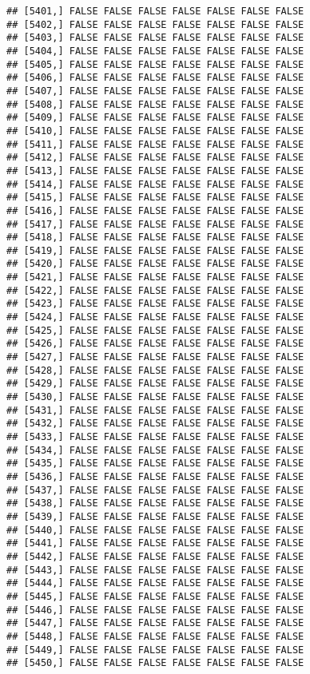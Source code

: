 \documentclass[
]{article}
\begin{document}
\begin{verbatim}
## [5401,] FALSE FALSE FALSE FALSE FALSE FALSE FALSE
## [5402,] FALSE FALSE FALSE FALSE FALSE FALSE FALSE
## [5403,] FALSE FALSE FALSE FALSE FALSE FALSE FALSE
## [5404,] FALSE FALSE FALSE FALSE FALSE FALSE FALSE
## [5405,] FALSE FALSE FALSE FALSE FALSE FALSE FALSE
## [5406,] FALSE FALSE FALSE FALSE FALSE FALSE FALSE
## [5407,] FALSE FALSE FALSE FALSE FALSE FALSE FALSE
## [5408,] FALSE FALSE FALSE FALSE FALSE FALSE FALSE
## [5409,] FALSE FALSE FALSE FALSE FALSE FALSE FALSE
## [5410,] FALSE FALSE FALSE FALSE FALSE FALSE FALSE
## [5411,] FALSE FALSE FALSE FALSE FALSE FALSE FALSE
## [5412,] FALSE FALSE FALSE FALSE FALSE FALSE FALSE
## [5413,] FALSE FALSE FALSE FALSE FALSE FALSE FALSE
## [5414,] FALSE FALSE FALSE FALSE FALSE FALSE FALSE
## [5415,] FALSE FALSE FALSE FALSE FALSE FALSE FALSE
## [5416,] FALSE FALSE FALSE FALSE FALSE FALSE FALSE
## [5417,] FALSE FALSE FALSE FALSE FALSE FALSE FALSE
## [5418,] FALSE FALSE FALSE FALSE FALSE FALSE FALSE
## [5419,] FALSE FALSE FALSE FALSE FALSE FALSE FALSE
## [5420,] FALSE FALSE FALSE FALSE FALSE FALSE FALSE
## [5421,] FALSE FALSE FALSE FALSE FALSE FALSE FALSE
## [5422,] FALSE FALSE FALSE FALSE FALSE FALSE FALSE
## [5423,] FALSE FALSE FALSE FALSE FALSE FALSE FALSE
## [5424,] FALSE FALSE FALSE FALSE FALSE FALSE FALSE
## [5425,] FALSE FALSE FALSE FALSE FALSE FALSE FALSE
## [5426,] FALSE FALSE FALSE FALSE FALSE FALSE FALSE
## [5427,] FALSE FALSE FALSE FALSE FALSE FALSE FALSE
## [5428,] FALSE FALSE FALSE FALSE FALSE FALSE FALSE
## [5429,] FALSE FALSE FALSE FALSE FALSE FALSE FALSE
## [5430,] FALSE FALSE FALSE FALSE FALSE FALSE FALSE
## [5431,] FALSE FALSE FALSE FALSE FALSE FALSE FALSE
## [5432,] FALSE FALSE FALSE FALSE FALSE FALSE FALSE
## [5433,] FALSE FALSE FALSE FALSE FALSE FALSE FALSE
## [5434,] FALSE FALSE FALSE FALSE FALSE FALSE FALSE
## [5435,] FALSE FALSE FALSE FALSE FALSE FALSE FALSE
## [5436,] FALSE FALSE FALSE FALSE FALSE FALSE FALSE
## [5437,] FALSE FALSE FALSE FALSE FALSE FALSE FALSE
## [5438,] FALSE FALSE FALSE FALSE FALSE FALSE FALSE
## [5439,] FALSE FALSE FALSE FALSE FALSE FALSE FALSE
## [5440,] FALSE FALSE FALSE FALSE FALSE FALSE FALSE
## [5441,] FALSE FALSE FALSE FALSE FALSE FALSE FALSE
## [5442,] FALSE FALSE FALSE FALSE FALSE FALSE FALSE
## [5443,] FALSE FALSE FALSE FALSE FALSE FALSE FALSE
## [5444,] FALSE FALSE FALSE FALSE FALSE FALSE FALSE
## [5445,] FALSE FALSE FALSE FALSE FALSE FALSE FALSE
## [5446,] FALSE FALSE FALSE FALSE FALSE FALSE FALSE
## [5447,] FALSE FALSE FALSE FALSE FALSE FALSE FALSE
## [5448,] FALSE FALSE FALSE FALSE FALSE FALSE FALSE
## [5449,] FALSE FALSE FALSE FALSE FALSE FALSE FALSE
## [5450,] FALSE FALSE FALSE FALSE FALSE FALSE FALSE

\end{verbatim}
\end{document}
